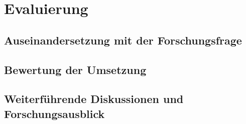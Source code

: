 


 

\chapter{Evaluierung} \label{cha:evaluation}
\section{Auseinandersetzung mit der Forschungsfrage}
\section{Bewertung der Umsetzung}\label{cha:rating}
\section{Weiterführende Diskussionen und Forschungsausblick}
 